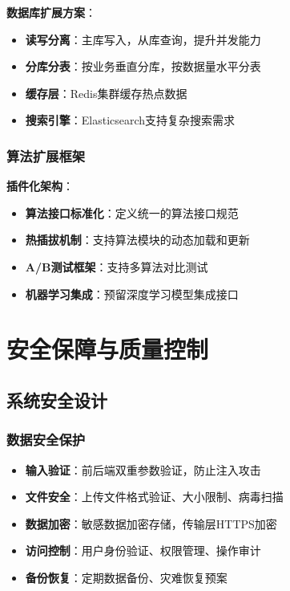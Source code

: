 \documentclass[12pt,a4paper]{article}
\begin{document}
\textbf{数据库扩展方案}：
\begin{itemize}
    \item \textbf{读写分离}：主库写入，从库查询，提升并发能力
    \item \textbf{分库分表}：按业务垂直分库，按数据量水平分表
    \item \textbf{缓存层}：Redis集群缓存热点数据
    \item \textbf{搜索引擎}：Elasticsearch支持复杂搜索需求
\end{itemize}

\subsubsection{算法扩展框架}

\begin{solutionbox}[title={算法模块扩展设计}]
\textbf{插件化架构}：
\begin{itemize}[nosep]
    \item \textbf{算法接口标准化}：定义统一的算法接口规范
    \item \textbf{热插拔机制}：支持算法模块的动态加载和更新
    \item \textbf{A/B测试框架}：支持多算法对比测试
    \item \textbf{机器学习集成}：预留深度学习模型集成接口
\end{itemize}
\end{solutionbox}

\section{安全保障与质量控制}

\subsection{系统安全设计}

\subsubsection{数据安全保护}

\begin{warningbox}[title={数据安全防护体系}]
\begin{itemize}[nosep]
    \item \textbf{输入验证}：前后端双重参数验证，防止注入攻击
    \item \textbf{文件安全}：上传文件格式验证、大小限制、病毒扫描
    \item \textbf{数据加密}：敏感数据加密存储，传输层HTTPS加密
    \item \textbf{访问控制}：用户身份验证、权限管理、操作审计
    \item \textbf{备份恢复}：定期数据备份、灾难恢复预案
\end{itemize}
\end{warningbox}
\end{document}
